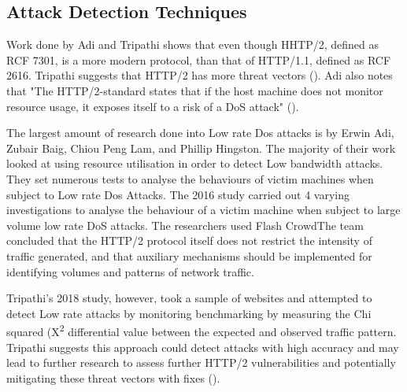 

\subsection{Attack Detection Techniques}

Work done by Adi and Tripathi shows that even though HHTP/2, defined as RCF 7301, is a more  modern protocol, than that of HTTP/1.1, defined as  RCF 2616. Tripathi suggests that HTTP/2 has more threat vectors (\cite{tripathi2018slow}). Adi also notes that "The HTTP/2-standard states that if the host machine does not monitor resource usage, it exposes itself to a risk of a DoS attack" (\cite{Adi2015}).

The largest amount of research done into Low rate Dos attacks is by Erwin Adi, Zubair Baig, Chiou Peng Lam, and Phillip Hingston. The majority of their work looked at using resource utilisation in order to detect Low bandwidth attacks. They set numerous tests to analyse the behaviours of victim machines when subject to Low rate Dos Attacks. The 2016 study carried out 4 varying investigations to analyse the behaviour of a victim machine when subject to large volume low rate DoS attacks. The researchers used Flash CrowdThe team concluded that the HTTP/2 protocol  itself does not restrict the intensity of traffic generated, and that auxiliary mechanisms should be implemented for identifying volumes and patterns of network traffic.

Tripathi's 2018 study, however, took a sample of websites and attempted to detect Low rate attacks by monitoring benchmarking by measuring the Chi squared (X\textsuperscript{\small2} differential value between the expected and observed traffic pattern. Tripathi suggests this approach could detect attacks with high accuracy and may lead to further research to assess further HTTP/2 vulnerabilities and potentially mitigating these threat vectors with fixes (\cite{tripathi2018slow}).